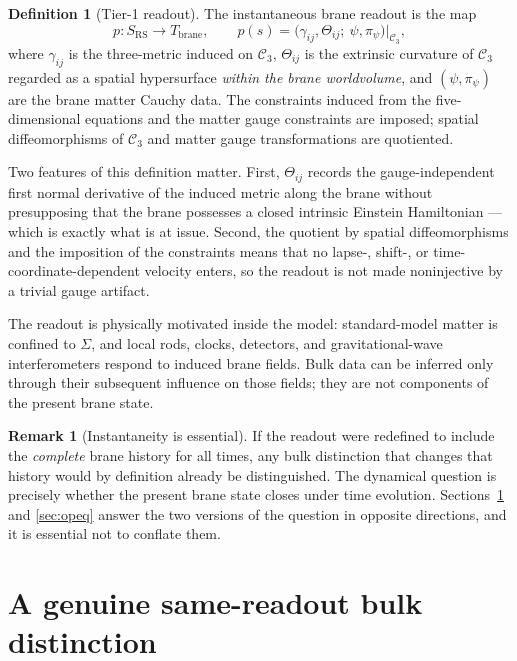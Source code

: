 \documentclass[11pt,a4paper]{article}
\theoremstyle{plain}
\theoremstyle{definition}
\newtheorem{definition}[theorem]{Definition}
\newtheorem{remark}[theorem]{Remark}
\newcommand{\RS}{\mathrm{RS}}
\begin{document}
\begin{definition}[Tier-1 readout]
\label{def:readout}
The instantaneous brane readout is the map
\begin{equation}
\label{eq:readout}
p:S_{\RS}\longrightarrow T_{\mathrm{brane}},
\qquad
p(s)=\bigl(\gamma_{ij},\Theta_{ij};\ \psi,\pi_\psi\bigr)\big|_{\mathcal C_3},
\end{equation}
where $\gamma_{ij}$ is the three-metric induced on $\mathcal C_3$,
$\Theta_{ij}$ is the extrinsic curvature of $\mathcal C_3$ regarded as a
spatial hypersurface \emph{within the brane worldvolume}, and
$(\psi,\pi_\psi)$ are the brane matter Cauchy data. The constraints
induced from the five-dimensional equations and the matter gauge
constraints are imposed; spatial diffeomorphisms of $\mathcal C_3$ and
matter gauge transformations are quotiented.
\end{definition}

Two features of this definition matter. First, $\Theta_{ij}$ records the
gauge-independent first normal derivative of the induced metric along the
brane without presupposing that the brane possesses a closed intrinsic
Einstein Hamiltonian --- which is exactly what is at issue. Second, the
quotient by spatial diffeomorphisms and the imposition of the constraints
means that no lapse-, shift-, or time-coordinate-dependent velocity
enters, so the readout is not made noninjective by a trivial gauge
artifact.

The readout is physically motivated inside the model: standard-model
matter is confined to $\Sigma$, and local rods, clocks, detectors, and
gravitational-wave interferometers respond to induced brane fields. Bulk
data can be inferred only through their subsequent influence on those
fields; they are not components of the present brane state.

\begin{remark}[Instantaneity is essential]
\label{rem:instant}
If the readout were redefined to include the \emph{complete} brane
history for all times, any bulk distinction that changes that history
would by definition already be distinguished. The dynamical question is
precisely whether the present brane state closes under time evolution.
Sections~\ref{sec:witness} and \ref{sec:opeq} answer the two versions of
the question in opposite directions, and it is essential not to conflate
them.
\end{remark}

\section{A genuine same-readout bulk distinction}
\label{sec:witness}
\end{document}
